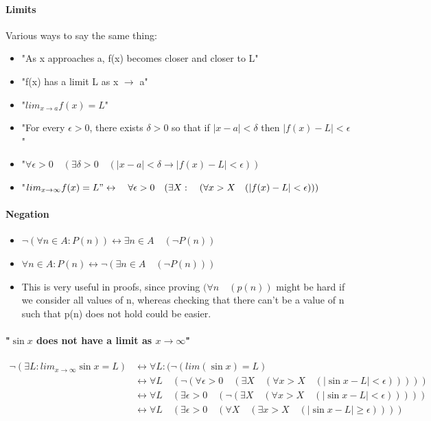 \documentclass[9pt, letterpaper, oneside]{article}
\newcommand*\dbl{\leftrightarrow}
\begin{document}
\paragraph{Limits}
Various ways to say the same thing:
\begin{itemize}
\item "As x approaches a, f(x) becomes closer and closer to L"
\item "f(x) has a limit L as x $\to$ a" 
\item "$lim_{x \to a} f(x) = L$"
\item "For every $\epsilon > 0$, there exists $\delta > 0$ so that if $| x - a | < \delta$ then $|f(x) - L |< \epsilon$"
\item "$\forall \epsilon > 0 \quad (\exists \delta > 0 \quad (|x-a|<\delta \to |f(x) - L | < \epsilon))$
\item "$lim_{x \to \infty} f(x) = L" \dbl \quad \forall \epsilon > 0 \quad (\exists X : \quad (\forall x > X \quad (|f(x) - L| < \epsilon)))$
\end{itemize}

\paragraph{Negation}
\begin{itemize}
\item
$\neg(\forall n \in A : P(n)) \dbl \exists n \in A \quad (\neg P(n))$
\item
$\forall n \in A : P(n) \dbl \neg(\exists n \in A \quad (\neg P(n)))$
\item
This is very useful in proofs, since proving $(\forall n \quad (p(n))$ might be hard if we consider all
values of n, whereas checking that there can't be a value of n such that p(n) does
not hold could be easier.
\end{itemize}
\paragraph{"$\sin x$ does not have a limit as $x \to \infty$"}
\begin{align*}
\neg(\exists L : lim_{x \to \infty} \sin x = L)
&\dbl \forall L : (\neg (lim(\sin x) = L)\\
&\dbl \forall L \quad (\neg(\forall \epsilon > 0 \quad (\exists X \quad (\forall x > X \quad (|\sin x - L| <\epsilon)))))\\
&\dbl \forall L \quad (\exists \epsilon > 0 \quad (\neg (\exists X  \quad (\forall x > X \quad (|\sin x - L| <\epsilon)))))\\
&\dbl \forall L \quad (\exists \epsilon > 0 \quad (\forall X \quad (\exists x > X \quad (|\sin{x} -L | \geq \epsilon))))\\
\end{align*}
\end{document}
